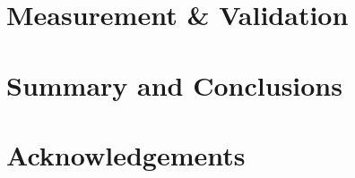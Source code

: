 \documentclass[conference]{../../resources/IEEEtran/IEEEtran}
\begin{document}

\section{Measurement \& Validation}
\label{sec:valid}



\section{Summary and Conclusions}
\label{sec:conclusion}



\section{Acknowledgements}
\label{sec:ack}












\end{document}
